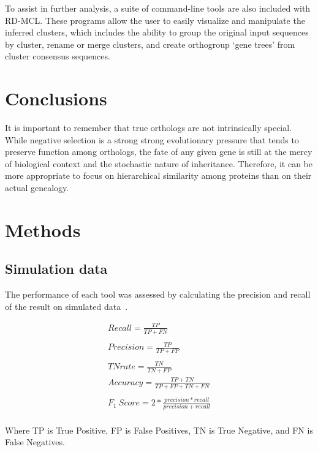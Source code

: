 \documentclass[twocolumn]{bmcart}  %
\begin{document}
To assist in further analysis, a suite of command-line tools are also included with RD-MCL\@.
These programs allow the user to easily visualize and manipulate the inferred clusters, which includes the ability to group the original input sequences by cluster, rename or merge clusters, and create orthogroup `gene trees' from cluster consensus sequences.


\section{Conclusions}\label{sec:conclusions}
It is important to remember that true orthologs are not intrinsically special.
While negative selection is a strong strong evolutionary pressure that tends to preserve function among orthologs, the fate of any given gene is still at the mercy of biological context and the stochastic nature of inheritance.
Therefore, it can be more appropriate to focus on hierarchical similarity among proteins than on their actual genealogy.


\section{Methods}\label{sec:methods}
\subsection{Simulation data}\label{subsec:simulationData}
The performance of each tool was assessed by calculating the precision and recall of the result on simulated data~\cite{Emms:2015ig}.

\begin{gather*}
    Recall = \frac{TP}{TP + FN}\\
    \\
    Precision = \frac{TP}{TP + FP}\\
    \\
    TN rate = \frac{TN}{TN + FP}
    \\
    Accuracy = \frac{TP + TN}{TP + FP + TN + FN}\\
    \\
    F_1\ Score = 2 * \frac{precision * recall}{precision + recall}\\
\end{gather*}

Where TP is True Positive, FP is False Positives, TN is True Negative, and FN is False Negatives.
\end{document}
